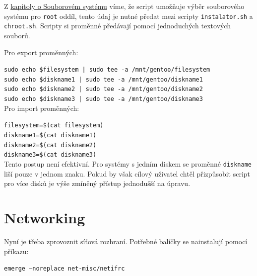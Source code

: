 \documentclass[12pt,a4paper,twoside,]{article}
\begin{document}
Z \hyperlink{Souborový systém}{kapitoly o Souborovém systému} víme, že script umožňuje výběr souborového systému pro \texttt{root} oddíl, tento údaj je nutné předat mezi scripty \texttt{instalator.sh} a \texttt{chroot.sh}. Scripty si proměnné předávají pomocí jednoduchých textových souborů.

\hspace*{-1.5em}Pro export proměnných:

\texttt{sudo echo \$filesystem | sudo tee -a /mnt/gentoo/filesystem} \\
\hspace*{1.5em}\texttt{sudo echo \$diskname1 | sudo tee -a /mnt/gentoo/diskname1} \\
\hspace*{1.5em}\texttt{sudo echo \$diskname2 | sudo tee -a /mnt/gentoo/diskname2} \\
\hspace*{1.5em}\texttt{sudo echo \$diskname3 | sudo tee -a /mnt/gentoo/diskname3} \\

\hspace*{-1.5em}Pro import proměnných:

\texttt{filesystem=\$(cat filesystem)}\\
\hspace*{1.5em}\texttt{diskname1=\$(cat diskname1)}\\
\hspace*{1.5em}\texttt{diskname2=\$(cat diskname2)}\\
\hspace*{1.5em}\texttt{diskname3=\$(cat diskname3)}\\

\hspace*{-1.5em}Tento postup není efektivní. Pro systémy s jedním diskem se proměnné \texttt{diskname} liší pouze v jednom znaku. Pokud by však cílový uživatel chtěl přizpůsobit script pro více disků je výše zmíněný přístup jednodušší na úpravu.
\newpage

\section{\textsf{Networking}}

Nyní je třeba zprovoznit síťová rozhraní. Potřebné balíčky se nainstalují pomocí příkazu:

\texttt{emerge --noreplace net-misc/netifrc}\\
\end{document}
